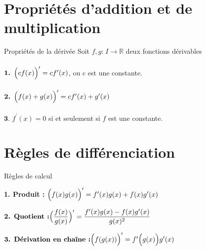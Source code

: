 \documentclass{report}
\begin{document}
\begin{multicols*}{3}
\columnbreak

\section{Propriétés d'addition et de multiplication}
\begin{Concept}{Propriétés de la dérivée}{}
  Soit $f, g \text{:} \; I \rightarrow \mathbb{R}$ deux fonctions dérivables \\\\
  $\textbf{1. } \Bigl(cf(x)\Bigr)^{\prime} = cf^{\prime}(x)$, ou c est une constante. \\\\
  $\textbf{2. } \Bigl(f(x) + g(x)\Bigr)^{\prime} = cf^{\prime}(x) +  g^{\prime}(x)$ \\\\
  $\textbf{3. } f^{\prime}(x) = 0$ si et seulement si $f$ est une constante. 
\end{Concept}



\section{Règles de différenciation}
\begin{Concept}{Règles de calcul}{}
\begin{adjustbox}{width=1\textwidth}
\textbf{1. Produit :}
  $\Bigl(f(x)g(x)\Bigr)^{\prime} = f^{\prime}(x)g(x) + f(x)g^{\prime}(x)$
\end{adjustbox}

\vspace{1em}

\begin{adjustbox}{width=1\textwidth}
  $\textbf{2. Quotient :} \Bigl(\dfrac{f(x)}{g(x)}\Bigr)^{\prime} = \dfrac{f^{\prime}(x)g(x) - f(x)g^{\prime}(x)}{g(x)^2}$ 
\end{adjustbox}

\vspace{1em}

\begin{adjustbox}{width=1\textwidth}
  $\textbf{3. Dérivation en chaîne :} \Bigl(f(g(x)) \Bigr)^{\prime} = f^{\prime}\Bigl(g(x)\Bigr)g^{\prime}(x)$
\end{adjustbox}
\end{Concept} 


\end{multicols*}
\end{document}
